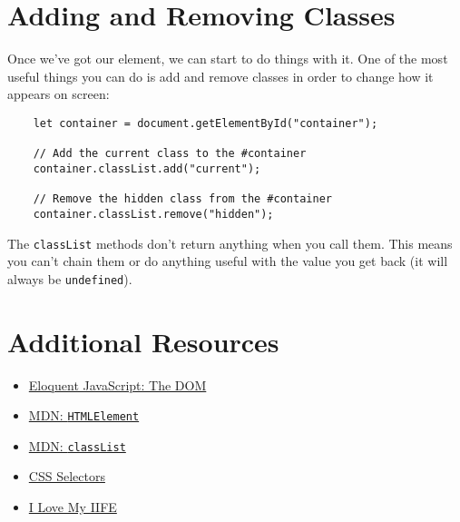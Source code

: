 \pagebreak

\section{Adding and Removing Classes}

Once we've got our element, we can start to do things with it. One of the most useful things you can do is add and remove classes in order to change how it appears on screen:

\begin{verbatim}
    let container = document.getElementById("container");

    // Add the current class to the #container
    container.classList.add("current");

    // Remove the hidden class from the #container
    container.classList.remove("hidden");
\end{verbatim}

The \texttt{classList} methods don't return anything when you call them. This means you can't chain them or do anything useful with the value you get back (it will always be \texttt{undefined}).



\section{Additional Resources}

\begin{itemize}[leftmargin=*]
    \item \href{https://eloquentjavascript.net/13_dom.html}{Eloquent JavaScript: The DOM}
    \item \href{https://developer.mozilla.org/en-US/docs/Web/API/HTMLElement}{MDN: \texttt{HTMLElement}}
    \item \href{https://developer.mozilla.org/en-US/docs/Web/API/Element/classList}{MDN: \texttt{classList}}
    \item \href{https://www.sitepoint.com/css-selectors/}{CSS Selectors}
    \item \href{http://gregfranko.com/blog/i-love-my-iife/}{I Love My IIFE}
\end{itemize}
